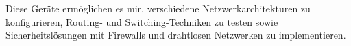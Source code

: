 \documentclass[11pt, a4paper]{awesome-cv}
\begin{document}
\begin{cvletter}
Diese Geräte ermöglichen es mir, verschiedene Netzwerkarchitekturen zu konfigurieren, Routing- und Switching-Techniken zu testen sowie Sicherheitslösungen mit Firewalls und drahtlosen Netzwerken zu implementieren.




\end{cvletter}


\makeletterclosing
\end{document}
